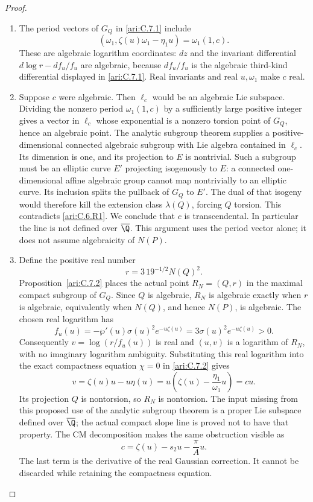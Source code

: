 \begin{proof}
\begin{enumerate}[label=\arabic*.,leftmargin=*]
\item The period vectors of $G_Q$ in \ref{ari:C.7.1} include
\[
 (\omega_1,\zeta(u)\omega_1-\eta_1u)
       =\omega_1(1,c).
\]
These are algebraic logarithm coordinates: $dz$ and the
invariant differential $d\log r-df_u/f_u$ are algebraic,
because $df_u/f_u$ is the algebraic third-kind differential
displayed in \ref{ari:C.7.1}. Real invariants and real $u,\omega_1$
make $c$ real.

\item Suppose $c$ were algebraic. Then $\ell_c$ would be an
algebraic Lie subspace. Dividing the nonzero period
$\omega_1(1,c)$ by a sufficiently large positive integer
gives a vector in $\ell_c$ whose exponential is a nonzero
torsion point of $G_Q$, hence an algebraic point. The
analytic subgroup theorem
\citep[Theorem~6.1, arXiv v8, p.~43]{huber2022} supplies a positive-dimensional
connected algebraic subgroup with Lie algebra contained in
$\ell_c$. Its dimension is one, and its projection to $E$
is nontrivial. Such a subgroup must be an elliptic curve
$E'$ projecting isogenously to $E$: a connected
one-dimensional affine algebraic group cannot map
nontrivially to an elliptic curve. Its inclusion splits the
pullback of $G_Q$ to $E'$. The dual of that isogeny would
therefore kill the extension class $\lambda(Q)$, forcing
$Q$ torsion. This contradicts \ref{ari:C.6.R1}. We conclude that $c$
is transcendental. In particular the line is not defined over
$\overline\Q$. This argument uses the period vector alone;
it does not assume algebraicity of $N(P)$.

\item Define the positive real number
\[
 r=3\,19^{-1/2}N(Q)^2.
\]
Proposition~\ref{ari:C.7.2} places the actual point $R_N=(Q,r)$
in the maximal compact subgroup of $G_Q$. Since $Q$ is algebraic,
$R_N$ is algebraic exactly when $r$ is algebraic, equivalently
when $N(Q)$, and hence $N(P)$, is algebraic. The chosen real
logarithm has
\[
 f_u(u)=-\wp'(u)\sigma(u)^2e^{-u\zeta(u)}
        =3\sigma(u)^2e^{-u\zeta(u)}>0.
\]
Consequently $v=\log(r/f_u(u))$ is real and
$(u,v)$ is a logarithm of $R_N$, with no imaginary logarithm
ambiguity. Substituting this real logarithm into the exact
compactness equation $\chi=0$ in \ref{ari:C.7.2} gives
\[
 v=\zeta(u)u-u\eta(u)
   =u\left(\zeta(u)-\frac{\eta_1}{\omega_1}u\right)=cu.
\]
Its projection $Q$ is nontorsion, so $R_N$ is nontorsion.
The input missing from this proposed use of the analytic
subgroup theorem is a proper Lie subspace defined over
$\overline\Q$; the actual compact slope line is proved
not to have that property. The CM decomposition makes the
same obstruction visible as
\[
 c=\zeta(u)-s_2u-\frac{\pi}{A}u.
\]
The last term is the derivative of the real Gaussian
correction. It cannot be discarded while retaining the
compactness equation.
\end{enumerate}
\end{proof}

